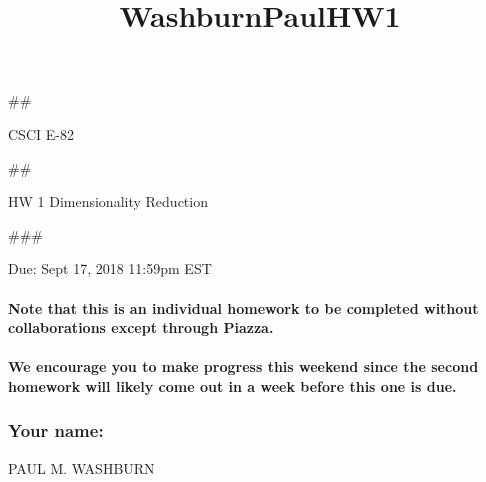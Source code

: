 \documentclass[11pt]{article}
\title{WashburnPaulHW1}
\begin{document}
    
    
    \maketitle
    
    

    
    \#\#

CSCI E-82

\#\#

HW 1 Dimensionality Reduction

\#\#\#

Due: Sept 17, 2018 11:59pm EST

\paragraph{Note that this is an individual homework to be completed
without collaborations except through
Piazza.}\label{note-that-this-is-an-individual-homework-to-be-completed-without-collaborations-except-through-piazza.}

\paragraph{We encourage you to make progress this weekend since the
second homework will likely come out in a week before this one is
due.}\label{we-encourage-you-to-make-progress-this-weekend-since-the-second-homework-will-likely-come-out-in-a-week-before-this-one-is-due.}

    \subsubsection{Your name:}\label{your-name}

    PAUL M. WASHBURN
\end{document}
